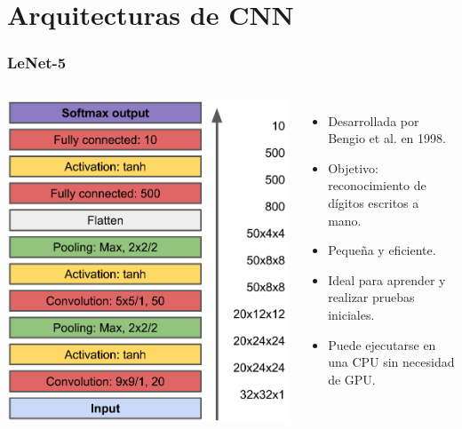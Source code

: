 \section{Arquitecturas de CNN}

\begin{frame}
    \frametitle{LeNet-5}

    \begin{columns}
    
    \begin{center}
        \includegraphics[width=0.9\linewidth]{Figuras/Img12.png}
    \end{center}
    
    \begin{itemize}
        \item Desarrollada por Bengio et al. en 1998.
        \item Objetivo: reconocimiento de dígitos escritos a mano.
        \item Pequeña y eficiente.
        \item Ideal para aprender y realizar pruebas iniciales.
        \item Puede ejecutarse en una CPU sin necesidad de GPU.
    \end{itemize}

    \end{columns}

\end{frame}


